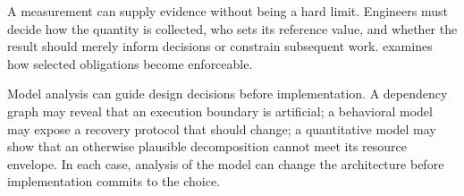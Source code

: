 
A measurement can supply evidence without being a hard limit. Engineers must decide how the quantity is collected, who sets its reference value, and whether the result should merely inform decisions or constrain subsequent work.  examines how selected obligations become enforceable.

Model analysis can guide design decisions before implementation. A dependency graph may reveal that an execution boundary is artificial; a behavioral model may expose a recovery protocol that should change; a quantitative model may show that an otherwise plausible decomposition cannot meet its resource envelope. In each case, analysis of the model can change the architecture before implementation commits to the choice.






